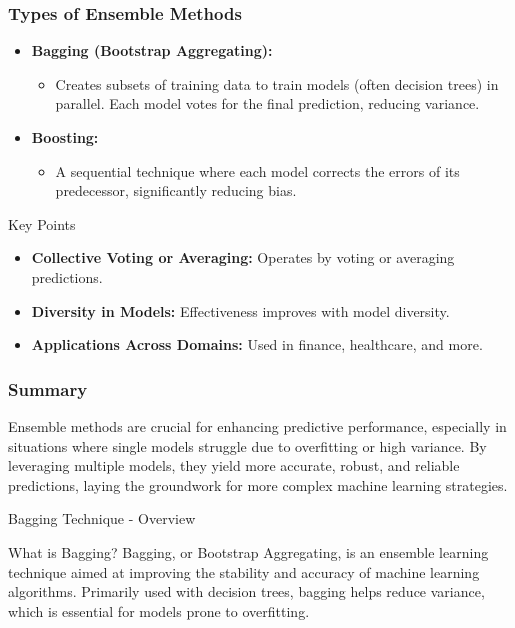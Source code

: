 \documentclass[aspectratio=169]{beamer}
\begin{document}
\begin{frame}[fragile]
    \frametitle{Types of Ensemble Methods}
    \begin{itemize}
        \item \textbf{Bagging (Bootstrap Aggregating):} 
        \begin{itemize}
            \item Creates subsets of training data to train models (often decision trees) in parallel. Each model votes for the final prediction, reducing variance.
        \end{itemize}

        \item \textbf{Boosting:} 
        \begin{itemize}
            \item A sequential technique where each model corrects the errors of its predecessor, significantly reducing bias.
        \end{itemize}
    \end{itemize}
    
    \begin{block}{Key Points}
        \begin{itemize}
            \item \textbf{Collective Voting or Averaging:} Operates by voting or averaging predictions.
            \item \textbf{Diversity in Models:} Effectiveness improves with model diversity.
            \item \textbf{Applications Across Domains:} Used in finance, healthcare, and more.
        \end{itemize}
    \end{block}
\end{frame}

\begin{frame}[fragile]
    \frametitle{Summary}
    Ensemble methods are crucial for enhancing predictive performance, especially in situations where single models struggle due to overfitting or high variance. By leveraging multiple models, they yield more accurate, robust, and reliable predictions, laying the groundwork for more complex machine learning strategies.
\end{frame}

\begin{frame}[fragile]{Bagging Technique - Overview}
    \begin{block}{What is Bagging?}
        Bagging, or Bootstrap Aggregating, is an ensemble learning technique aimed at improving the stability and accuracy of machine learning algorithms. Primarily used with decision trees, bagging helps reduce variance, which is essential for models prone to overfitting.
    \end{block}
\end{frame}
\end{document}

